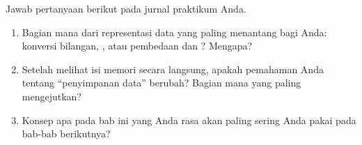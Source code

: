 \begin{refleksibox}
Jawab pertanyaan berikut pada jurnal praktikum Anda.
\begin{enumerate}
    \item Bagian mana dari representasi data yang paling menantang
          bagi Anda: konversi bilangan, , atau
          pembedaan  dan ? Mengapa?
    \item Setelah melihat isi memori secara langsung, apakah
          pemahaman Anda tentang ``penyimpanan data'' berubah?
          Bagian mana yang paling mengejutkan?
    \item Konsep apa pada bab ini yang Anda rasa akan paling sering
          Anda pakai pada bab-bab berikutnya?
\end{enumerate}
\end{refleksibox}
